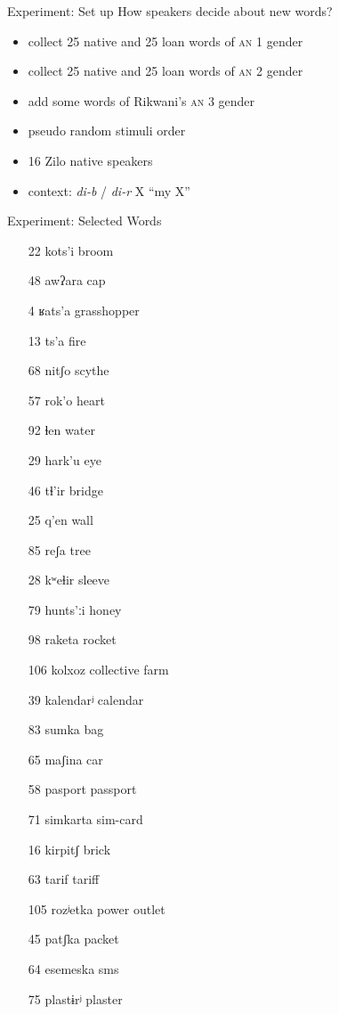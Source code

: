\documentclass[13pt, t]{beamer}
\begin{document}


\begin{frame}{Experiment: Set up}
\alert{How speakers decide about new words?}
\begin{itemize}
\item collect 25 native and 25 loan words of \textsc{an} 1 gender
\item collect 25 native and 25 loan words of \textsc{an} 2 gender
\item add some words of Rikwani's \textsc{an} 3 gender
\item pseudo random stimuli order
\item 16 Zilo native speakers
\item context:  \textit{di-b} / \textit{di-r} X ``my  X''
\end{itemize}
\end{frame}

\begin{frame}{Experiment: Selected Words}
\begin{multicols}{2}
\begin{itemize}
\item[22]    kots'i broom
\item[48]    awʔara cap
\item[4] ʁats'a grasshopper
\item[13]      ts'a fire
\item[68]      nitʃo scythe
\item[57]    rok'o heart
\item[92]        ɬen water
\item[29]     hark'u eye
\item[46]      tɬ'ir bridge
\item[25]      q'en wall
\item[85]     reʃa tree
\item[28]    kʷeɬir sleeve
\item[79]    hunts'ːi honey
\item[98]       raketa rocket
\item[106]       kolxoz collective farm
\item[39] 	kalendarʲ calendar
\item[83]         sumka bag
\item[65]       maʃina car
\item[58]    pasport passport
\item[71]       simkarta  sim-card
\item[16]      kirpitʃ brick
\item[63]         tarif tariff
\item[105]    rozʲetka  power outlet
\item[45]        patʃka packet
\item[64]      esemeska sms
\item[75]   plastɨrʲ plaster
\end{itemize}
\end{multicols}
\end{frame}
\end{document}
